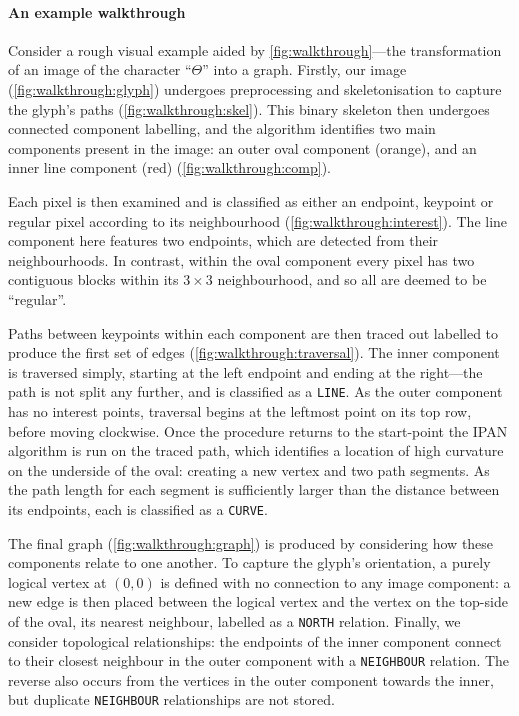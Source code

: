 \documentclass{mpaper}
\begin{document}
\paragraph{An example walkthrough}
Consider a rough visual example aided by \cref{fig:walkthrough}---the transformation of an image of the character ``$\Theta$'' into a graph.
Firstly, our image (\cref{fig:walkthrough:glyph}) undergoes preprocessing and skeletonisation to capture the glyph's paths (\cref{fig:walkthrough:skel}).
This binary skeleton then undergoes connected component labelling, and the algorithm  identifies two main components present in the image: an outer oval component (orange), and an inner line component (red) (\cref{fig:walkthrough:comp}).

Each pixel is then examined and is classified as either an endpoint, keypoint or regular pixel according to its neighbourhood (\cref{fig:walkthrough:interest}).
The line component here features two endpoints, which are detected from their neighbourhoods.
In contrast, within the oval component every pixel has two contiguous blocks within its $3\times3$ neighbourhood, and so all are deemed to be ``regular''.

Paths between keypoints within each component are then traced out labelled to produce the first set of edges (\cref{fig:walkthrough:traversal}).
The inner component is traversed simply, starting at the left endpoint and ending at the right---the path is not split any further, and is classified as a \texttt{LINE}.
As the outer component has no interest points, traversal begins at the leftmost point on its top row, before moving clockwise.
Once the procedure returns to the start-point the IPAN algorithm is run on the traced path, which identifies a location of high curvature on the underside of the oval: creating a new vertex and two path segments.
As the path length for each segment is sufficiently larger than the distance between its endpoints, each is classified as a \texttt{CURVE}.

The final graph (\cref{fig:walkthrough:graph}) is produced by considering how these components relate to one another.
To capture the glyph's orientation, a purely logical vertex at $(0,0)$ is defined with no connection to any image component: a new edge is then placed between the logical vertex and the vertex on the top-side of the oval, its nearest neighbour, labelled as a \texttt{NORTH} relation.
Finally, we consider topological relationships: the endpoints of the inner component connect to their closest neighbour in the outer component with a \texttt{NEIGHBOUR} relation.
The reverse also occurs from the vertices in the outer component towards the inner, but duplicate \texttt{NEIGHBOUR} relationships are not stored.
\end{document}
